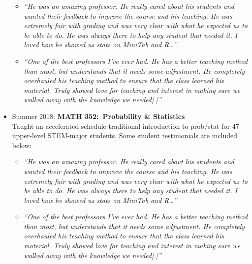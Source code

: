 \documentclass[paper=a4,fontsize=11pt]{scrartcl} %
\newcommand{\CourseEntry}[3]{
		\noindent \item{#1: \textbf{#2} \\ #3}}
\begin{document}
\begin{itemize}[noitemsep]
{\begin{itemize}
\item \emph{\small{``He was an amazing professor. He really cared about his students and wanted their feedback to improve the course and his teaching. He
was extremely fair with grading and was very clear with what he expected us to be able to do. He was always there to help any student that needed it. I loved how he showed us stats on MiniTab and R\ldots''}}
\item \emph{\small{``One of the best professors I've ever had. He has a better teaching method than most, but understands that it needs some adjustment.
He completely overhauled his teaching method to ensure that the class learned his material. Truly showed love for teaching and
interest in making sure we walked away with the knowledge we needed[.]''}}
\end{itemize}
}{} 

\CourseEntry{Summer 2018}{MATH 352:~Probability \& Statistics}{Taught an accelerated-schedule traditional introduction to prob/stat for 47 upper-level STEM-major students. Some student testimonials are included below:
\begin{itemize}
\item \emph{\small{``He was an amazing professor. He really cared about his students and wanted their feedback to improve the course and his teaching. He
was extremely fair with grading and was very clear with what he expected us to be able to do. He was always there to help any student that needed it. I loved how he showed us stats on MiniTab and R\ldots''}}
\item \emph{\small{``One of the best professors I've ever had. He has a better teaching method than most, but understands that it needs some adjustment.
He completely overhauled his teaching method to ensure that the class learned his material. Truly showed love for teaching and
interest in making sure we walked away with the knowledge we needed[.]''}}
\end{itemize}
}{} 


\end{itemize}
\end{document}
